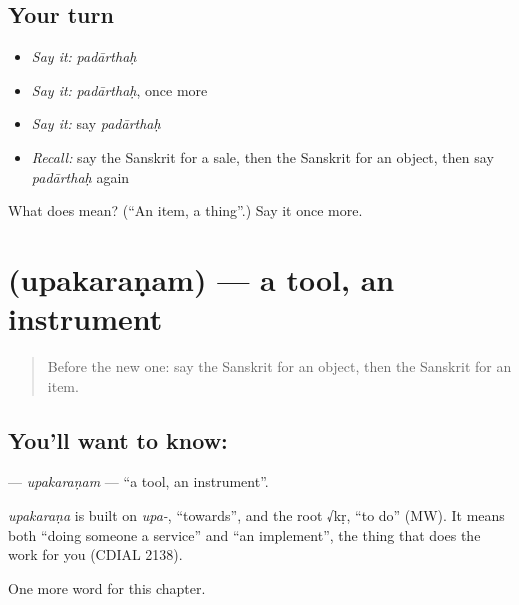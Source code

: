 \subsection*{Your turn}
\begin{itemize}
\raggedright
  \item \emph{Say it:} \emph{padārthaḥ}
  \item \emph{Say it:} \emph{padārthaḥ}, once more
  \item \emph{Say it:} say \emph{padārthaḥ}
  \item \emph{Recall:} say the Sanskrit for a sale, then the Sanskrit for an object, then say \emph{padārthaḥ} again
\end{itemize}

\begin{tcolorbox}[breakable,colback=teal!4,colframe=teal!35!black,title={Before you move on}]
What does  mean? (\textquotedblleft{}An item, a thing\textquotedblright{}.) Say it once more.
\end{tcolorbox}
\section[\texorpdfstring{\sk{उपकरणम्} (upakaraṇam)}{उपकरणम् (upakaraṇam)}]{ (upakaraṇam) — a tool, an instrument}

\label{lesson:SA-C193-upakaranam}



\begin{quote}
Before the new one: say the Sanskrit for an object, then the Sanskrit for an item.
\end{quote}

\subsection*{You'll want to know: }
\textbf{} — \emph{upakaraṇam} — \textquotedblleft{}a tool, an instrument\textquotedblright{}.

\begin{cousinweb}
\emph{upakaraṇa} is built on \emph{upa-}, \textquotedblleft{}towards\textquotedblright{}, and the root √kṛ, \textquotedblleft{}to do\textquotedblright{} (MW). It means both \textquotedblleft{}doing someone a service\textquotedblright{} and \textquotedblleft{}an implement\textquotedblright{}, the thing that does the work for you (CDIAL 2138).
\end{cousinweb}

\begin{grammarlens}[title={What you've built}]
One more word for this chapter.
\end{grammarlens}

